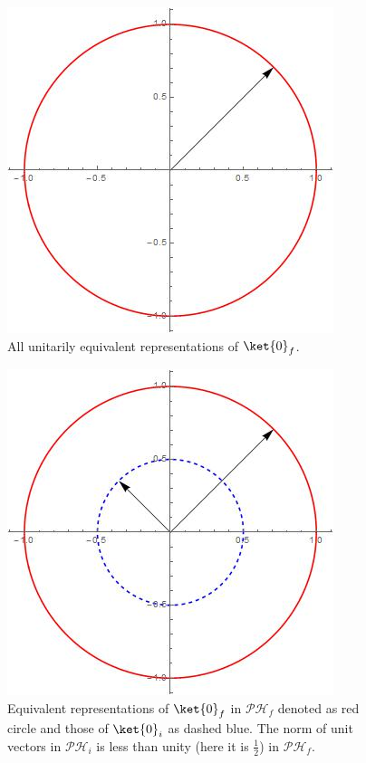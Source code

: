 \documentclass[12pt]{article}
\begin{document}
\begin{figure}
  \includegraphics[width=\linewidth]{Hilbert2.jpg}
  \caption{All unitarily equivalent representations of $\ket{0}_f$. }
  \label{H2}
\end{figure}

\begin{figure}
  \includegraphics[width=\linewidth]{Hilbert3.jpg}
  \caption{Equivalent representations of $\ket{0}_f$ in $\mathcal{PH}_f$ denoted as red circle and those of $\ket{0}_i$ as dashed blue. The norm of unit vectors in  $\mathcal{PH}_i$ is less than unity (here it is $\frac{1}{2}$) in  $\mathcal{PH}_f$. }
  \label{H3}
\end{figure}
\end{document}
